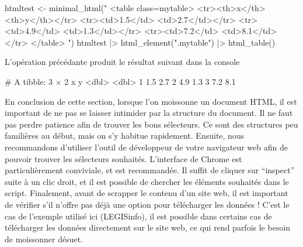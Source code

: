\documentclass[
  letterpaper,
  DIV=11,
  numbers=noendperiod]{scrreprt}
\newenvironment{Shaded}{\begin{snugshade}}{\end{snugshade}}
\newcommand{\CommentTok}[1]{\textcolor[rgb]{0.37,0.37,0.37}{#1}}
\newcommand{\ErrorTok}[1]{\textcolor[rgb]{0.68,0.00,0.00}{#1}}
\newcommand{\ExtensionTok}[1]{\textcolor[rgb]{0.00,0.23,0.31}{#1}}
\newcommand{\KeywordTok}[1]{\textcolor[rgb]{0.00,0.23,0.31}{#1}}
\newcommand{\NormalTok}[1]{\textcolor[rgb]{0.00,0.23,0.31}{#1}}
\newcommand{\OperatorTok}[1]{\textcolor[rgb]{0.37,0.37,0.37}{#1}}
\newcommand{\StringTok}[1]{\textcolor[rgb]{0.13,0.47,0.30}{#1}}
\begin{document}
\begin{Shaded}
\begin{Highlighting}[]
\ExtensionTok{htmltest} \OperatorTok{\textless{}}\NormalTok{{-} minimal\_html}\ErrorTok{(}\StringTok{"}
\StringTok{  \textless{}table class=\textquotesingle{}mytable\textquotesingle{}\textgreater{}}
\StringTok{\textless{}tr\textgreater{}\textless{}th\textgreater{}x\textless{}/th\textgreater{}   \textless{}th\textgreater{}y\textless{}/th\textgreater{}\textless{}/tr\textgreater{}}
\StringTok{\textless{}tr\textgreater{}\textless{}td\textgreater{}1.5\textless{}/td\textgreater{} \textless{}td\textgreater{}2.7\textless{}/td\textgreater{}\textless{}/tr\textgreater{}}
\StringTok{\textless{}tr\textgreater{}\textless{}td\textgreater{}4.9\textless{}/td\textgreater{} \textless{}td\textgreater{}1.3\textless{}/td\textgreater{}\textless{}/tr\textgreater{}}
\StringTok{\textless{}tr\textgreater{}\textless{}td\textgreater{}7.2\textless{}/td\textgreater{} \textless{}td\textgreater{}8.1\textless{}/td\textgreater{}\textless{}/tr\textgreater{}}
\StringTok{\textless{}/table\textgreater{}}
\StringTok{  "}\KeywordTok{)}
  \ExtensionTok{htmltest} \KeywordTok{|}\OperatorTok{\textgreater{}}
  \ExtensionTok{html\_element}\ErrorTok{(}\StringTok{".mytable"}\KeywordTok{)} \KeywordTok{|}\OperatorTok{\textgreater{}}\NormalTok{ html\_table}\KeywordTok{()}
\end{Highlighting}
\end{Shaded}

L'opération précédante produit le résultat suivant dans la console

\begin{Shaded}
\begin{Highlighting}[]
\CommentTok{\# A tibble: 3 × 2}
      \ExtensionTok{x}\NormalTok{     y}
  \OperatorTok{\textless{}}\NormalTok{dbl}\OperatorTok{\textgreater{}} \OperatorTok{\textless{}}\NormalTok{dbl}\OperatorTok{\textgreater{}}
\ExtensionTok{1}\NormalTok{   1.5   2.7}
\ExtensionTok{2}\NormalTok{   4.9   1.3}
\ExtensionTok{3}\NormalTok{   7.2   8.1}
\end{Highlighting}
\end{Shaded}

En conclusion de cette section, lorsque l'on moissonne un document HTML,
il est important de ne pas se laisser intimider par la structure du
document. Il ne faut pas perdre patience afin de trouver les bons
sélecteurs. Ce sont des structures peu familières au début, mais on s'y
habitue rapidement. Ensuite, nous recommandons d'utiliser l'outil de
développeur de votre navigateur web afin de pouvoir trouver les
sélecteurs souhaités. L'interface de Chrome est particulièrement
conviviale, et est recommandée. Il suffit de cliquer sur ``inspect''
suite à un clic droit, et il est possible de chercher les éléments
souhaités dans le script. Finalement, avant de scrapper le contenu d'un
site web, il est important de vérifier s'il n'offre pas déjà une option
pour télécharger les données ! C'est le cas de l'exemple utilisé ici
(LEGISinfo), il est possible dans certains cas de télécharger les
données directement sur le site web, ce qui rend parfois le besoin de
moissonner désuet.
\end{document}
